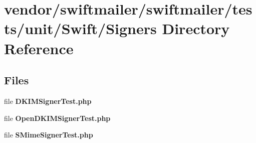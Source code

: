 \section{vendor/swiftmailer/swiftmailer/tests/unit/\+Swift/\+Signers Directory Reference}
\label{dir_c5678c6612b9cdf9fdf44ee4a6cbb1ae}
\subsection*{Files}
\begin{DoxyCompactItemize}
\item 
file {\bf D\+K\+I\+M\+Signer\+Test.\+php}
\item 
file {\bf Open\+D\+K\+I\+M\+Signer\+Test.\+php}
\item 
file {\bf S\+Mime\+Signer\+Test.\+php}
\end{DoxyCompactItemize}
